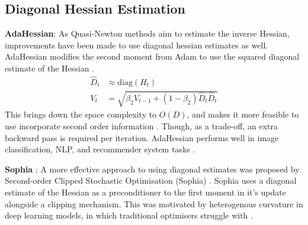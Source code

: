 \subsection{Diagonal Hessian Estimation} \label{sec:diag_hessian}
\textbf{AdaHessian}: As Quasi-Newton methods aim to estimate the inverse Hessian, improvements have been made to use diagonal hessian estimates as well. AdaHessian modifies the second moment from Adam to use the squared diagonal estimate of the Hessian \citep{yao2021adahessian}.
\begin{align}
    \hat{D}_t &\approx \text{diag}(H_t) \\
    V_t &= \sqrt{\beta_2 V_{t-1} + (1 - \beta_2) \hat{D}_t\hat{D}_t}
\end{align}
This brings down the space complexity to $O(D)$, and makes it more feasible to use incorporate second order information \citep{yao2021adahessian}. Though, as a trade-off, an extra backward pass is required per iteration. AdaHessian performs well in image classification, NLP, and recommender system tasks \citep{yao2021adahessian}.

\textbf{Sophia} : A more effective approach to using diagonal estimates was proposed by Second-order Clipped Stochastic Optimisation (Sophia) \citep{liu2023sophia}. Sophia uses a diagonal estimate of the Hessian as a preconditioner to the first moment in it's update alongside a clipping mechanism. This was motivated by heterogenous curvature in deep learning models, in which traditional optimisers struggle with \citep{liu2023sophia}. 

